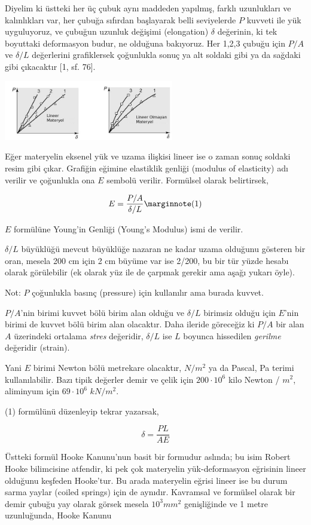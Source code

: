 \documentclass[12pt,fleqn]{article}\usepackage{../../common}
\begin{document}
Diyelim ki üstteki her üç çubuk aynı maddeden yapılmış, farklı uzunlukları ve
kalınlıkları var, her çubuğa sıfırdan başlayarak belli seviyelerde $P$ kuvveti
ile yük uyguluyoruz, ve çubuğun uzunluk değişimi (elongation) $\delta$
değerinin, ki tek boyuttaki deformasyon budur, ne olduğuna bakıyoruz. Her 1,2,3
çubuğu için $P/A$ ve $\delta/L$ değerlerini grafiklersek çoğunlukla sonuç ya alt
soldaki gibi ya da sağdaki gibi çıkacaktır [1, sf. 76].

\includegraphics[width=20em]{phy_020_strs_00_02.jpg}

Eğer materyelin eksenel yük ve uzama ilişkisi lineer ise o zaman sonuç soldaki
resim gibi çıkar. Grafiğin eğimine elastiklik genliği (modulus of elasticity)
adı verilir ve çoğunlukla ona $E$ sembolü verilir. Formülsel olarak belirtirsek,

$$
E = \frac{P/A}{\delta / L}
\mlabel{1}
$$

$E$ formülüne Young'in Genliği (Young's Modulus) ismi de verilir. 

$\delta/L$ büyüklüğü mevcut büyüklüğe nazaran ne kadar uzama olduğunu gösteren
bir oran, mesela 200 cm için 2 cm büyüme var ise 2/200, bu bir tür yüzde hesabı
olarak görülebilir (ek olarak yüz ile de çarpmak gerekir ama aşağı yukarı öyle).

Not: $P$ çoğunlukla basınç (pressure) için kullanılır ama burada kuvvet.

$P/A$'nin birimi kuvvet bölü birim alan olduğu ve $\delta / L$ birimsiz olduğu
için $E$'nin birimi de kuvvet bölü birim alan olacaktır. Daha ileride göreceğiz
ki $P/A$ bir alan $A$ üzerindeki ortalama {\em stres} değeridir, $\delta / L$
ise $L$ boyunca hissedilen {\em gerilme} değeridir (strain).

Yani $E$ birimi Newton bölü metrekare olacaktır, $N/m^2$ ya da Pascal, Pa terimi
kullanılabilir. Bazı tipik değerler demir ve çelik için $200\cdot 10^6$ kilo
Newton / $m^2$, aliminyum için $69 \cdot 10^6$ $kN / m^2$.

(1) formülünü düzenleyip tekrar yazarsak, 

$$
\delta = \frac{PL}{AE}
$$

Üstteki formül Hooke Kanunu'nun basit bir formudur aslında; bu isim Robert Hooke
bilimcisine atfendir, ki pek çok materyelin yük-deformasyon eğrisinin lineer
olduğunu keşfeden Hooke'tur. Bu arada materyelin eğrisi lineer ise bu durum
sarma yaylar (coiled springs) için de aynıdır. Kavramsal ve formülsel olarak
bir demir çubuğu yay olarak görsek mesela $10^3 mm^2$ genişliğinde ve
1 metre uzunluğunda, Hooke Kanunu
\end{document}
